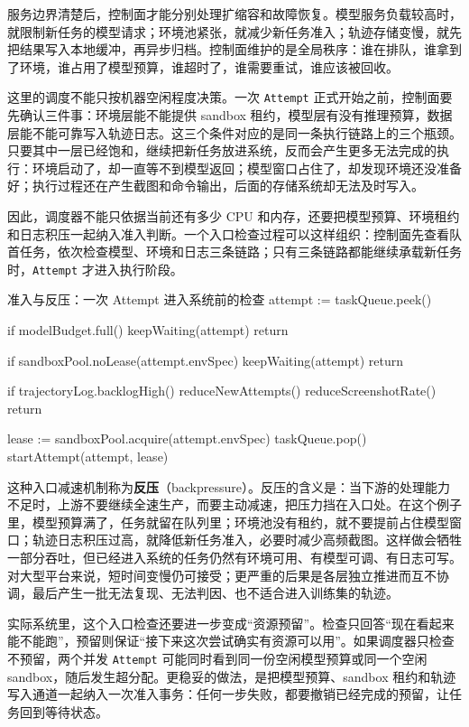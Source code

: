 服务边界清楚后，控制面才能分别处理扩缩容和故障恢复。模型服务负载较高时，就限制新任务的模型请求；环境池紧张，就减少新任务准入；轨迹存储变慢，就先把结果写入本地缓冲，再异步归档。控制面维护的是全局秩序：谁在排队，谁拿到了环境，谁占用了模型预算，谁超时了，谁需要重试，谁应该被回收。

这里的调度不能只按机器空闲程度决策。一次 \texttt{Attempt} 正式开始之前，控制面要先确认三件事：环境层能不能提供 sandbox 租约，模型层有没有推理预算，数据层能不能可靠写入轨迹日志。这三个条件对应的是同一条执行链路上的三个瓶颈。只要其中一层已经饱和，继续把新任务放进系统，反而会产生更多无法完成的执行：环境启动了，却一直等不到模型返回；模型窗口占住了，却发现环境还没准备好；执行过程还在产生截图和命令输出，后面的存储系统却无法及时写入。

因此，调度器不能只依据当前还有多少 CPU 和内存，还要把模型预算、环境租约和日志积压一起纳入准入判断。一个入口检查过程可以这样组织：控制面先查看队首任务，依次检查模型、环境和日志三条链路；只有三条链路都能继续承载新任务时，\texttt{Attempt} 才进入执行阶段。

\begin{pseudocodebox}{准入与反压：一次 Attempt 进入系统前的检查}
attempt := taskQueue.peek()

if modelBudget.full() {
    keepWaiting(attempt)
    return
}

if sandboxPool.noLease(attempt.envSpec) {
    keepWaiting(attempt)
    return
}

if trajectoryLog.backlogHigh() {
    reduceNewAttempts()
    reduceScreenshotRate()
    return
}

lease := sandboxPool.acquire(attempt.envSpec)
taskQueue.pop()
startAttempt(attempt, lease)
\end{pseudocodebox}

这种入口减速机制称为\textbf{反压}（backpressure）。反压的含义是：当下游的处理能力不足时，上游不要继续全速生产，而要主动减速，把压力挡在入口处。在这个例子里，模型预算满了，任务就留在队列里；环境池没有租约，就不要提前占住模型窗口；轨迹日志积压过高，就降低新任务准入，必要时减少高频截图。这样做会牺牲一部分吞吐，但已经进入系统的任务仍然有环境可用、有模型可调、有日志可写。对大型平台来说，短时间变慢仍可接受；更严重的后果是各层独立推进而互不协调，最后产生一批无法复现、无法判因、也不适合进入训练集的轨迹。

实际系统里，这个入口检查还要进一步变成“资源预留”。检查只回答“现在看起来能不能跑”，预留则保证“接下来这次尝试确实有资源可以用”。如果调度器只检查不预留，两个并发 \texttt{Attempt} 可能同时看到同一份空闲模型预算或同一个空闲 sandbox，随后发生超分配。更稳妥的做法，是把模型预算、sandbox 租约和轨迹写入通道一起纳入一次准入事务：任何一步失败，都要撤销已经完成的预留，让任务回到等待状态。


